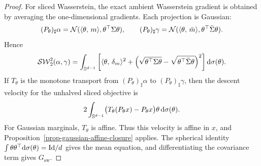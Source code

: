 \begin{proof}
	For sliced Wasserstein, the exact ambient Wasserstein gradient is obtained by averaging the one-dimensional gradients. Each projection is Gaussian:
	\[
		(P_\theta)_\sharp\alpha=\mathcal{N}(\langle \theta,\,m\rangle,\theta^\top\Sigma\theta),
		\qquad
		(P_\theta)_\sharp\gamma=\mathcal{N}(\langle \theta,\,\bar m\rangle,\theta^\top\bar\Sigma\theta).
	\]
	Hence
	\[
		\operatorname{\mathcal{SW}}_2^2(\alpha,\gamma)
		=
		\int_{\mathbb{S}^{d-1}}
		\left[
			\langle \theta,\,\delta_m\rangle^2
			+
			\left(\sqrt{\theta^\top\Sigma\theta}
			-\sqrt{\theta^\top\bar\Sigma\theta}\right)^2
		\right]\mathrm{d}\sigma(\theta).
	\]
	If \(T_\theta\) is the monotone transport from \((P_\theta)_\sharp\alpha\) to \((P_\theta)_\sharp\gamma\), then the descent velocity for the unhalved sliced objective is
	\[
		2\int_{\mathbb{S}^{d-1}}\bigl(T_\theta(P_\theta x)-P_\theta x\bigr)\theta\,\mathrm{d}\sigma(\theta).
	\]
	For Gaussian marginals, \(T_\theta\) is affine. Thus this velocity is affine in \(x\), and Proposition~\ref{prop-gaussian-affine-closure} applies. The spherical identity \(\int\theta\theta^\top\mathrm{d}\sigma(\theta)=\mathrm{Id}/d\) gives the mean equation, and differentiating the covariance term gives \(G_{\mathrm{sw}}\).
\end{proof}

